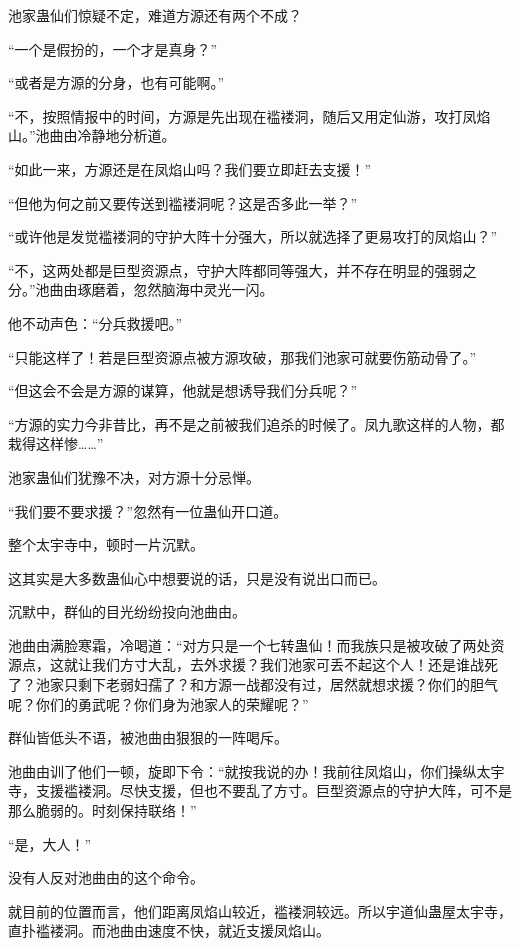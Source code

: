 \begin{this_body}
池家蛊仙们惊疑不定，难道方源还有两个不成？

“一个是假扮的，一个才是真身？”

“或者是方源的分身，也有可能啊。”

“不，按照情报中的时间，方源是先出现在褴褛洞，随后又用定仙游，攻打凤焰山。”池曲由冷静地分析道。

“如此一来，方源还是在凤焰山吗？我们要立即赶去支援！”

“但他为何之前又要传送到褴褛洞呢？这是否多此一举？”

“或许他是发觉褴褛洞的守护大阵十分强大，所以就选择了更易攻打的凤焰山？”

“不，这两处都是巨型资源点，守护大阵都同等强大，并不存在明显的强弱之分。”池曲由琢磨着，忽然脑海中灵光一闪。

他不动声色：“分兵救援吧。”

“只能这样了！若是巨型资源点被方源攻破，那我们池家可就要伤筋动骨了。”

“但这会不会是方源的谋算，他就是想诱导我们分兵呢？”

“方源的实力今非昔比，再不是之前被我们追杀的时候了。凤九歌这样的人物，都栽得这样惨……”

池家蛊仙们犹豫不决，对方源十分忌惮。

“我们要不要求援？”忽然有一位蛊仙开口道。

整个太宇寺中，顿时一片沉默。

这其实是大多数蛊仙心中想要说的话，只是没有说出口而已。

沉默中，群仙的目光纷纷投向池曲由。

池曲由满脸寒霜，冷喝道：“对方只是一个七转蛊仙！而我族只是被攻破了两处资源点，这就让我们方寸大乱，去外求援？我们池家可丢不起这个人！还是谁战死了？池家只剩下老弱妇孺了？和方源一战都没有过，居然就想求援？你们的胆气呢？你们的勇武呢？你们身为池家人的荣耀呢？”

群仙皆低头不语，被池曲由狠狠的一阵喝斥。

池曲由训了他们一顿，旋即下令：“就按我说的办！我前往凤焰山，你们操纵太宇寺，支援褴褛洞。尽快支援，但也不要乱了方寸。巨型资源点的守护大阵，可不是那么脆弱的。时刻保持联络！”

“是，大人！”

没有人反对池曲由的这个命令。

就目前的位置而言，他们距离凤焰山较近，褴褛洞较远。所以宇道仙蛊屋太宇寺，直扑褴褛洞。而池曲由速度不快，就近支援凤焰山。

\end{this_body}

